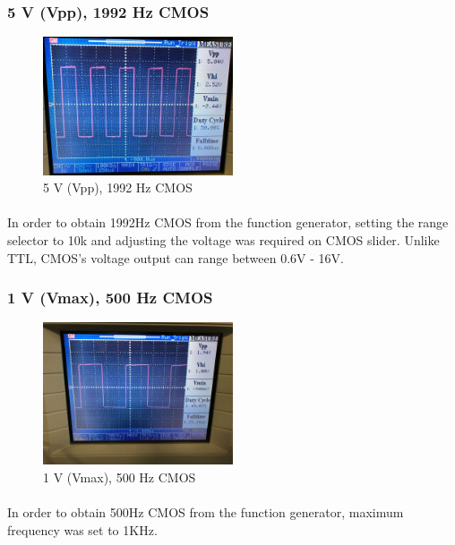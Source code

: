 \documentclass[pdftex,12pt,a4paper]{article}
\begin{document}
\newpage
\begin{flushleft}
\subsubsection{5 V (Vpp), 1992 Hz CMOS}
\begin{figure}[h]
    \centering
	\includegraphics[width=0.5\textwidth]{Photos/5_2_closeup.jpg}
	\caption{5 V (Vpp), 1992 Hz CMOS}
	\label{fig5}
\end{figure}
\paragraph{}
In order to obtain 1992Hz CMOS from the function generator, setting the range selector to 10k and adjusting the voltage was required on CMOS slider. Unlike TTL, CMOS's voltage output can range between 0.6V - 16V.
\end{flushleft}




\begin{flushleft}
\subsubsection{1 V (Vmax), 500 Hz CMOS}
\begin{figure}[h]
    \centering
	\includegraphics[width=0.5\textwidth]{Photos/5_3_closeup.jpg}
	\caption{1 V (Vmax), 500 Hz CMOS}
	\label{fig6}
\end{figure}
\paragraph{}
In order to obtain 500Hz CMOS from the function generator, maximum frequency was set to 1KHz. 

\end{flushleft}
\end{document}
